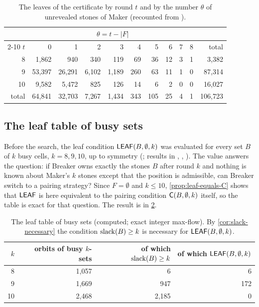 \begin{table}[ht]
\centering\small
\begin{tabular}{@{}rrrrrrrrrrr@{}}
\toprule
 & \multicolumn{9}{c}{$\theta=t-|F|$} & \\
\cmidrule(lr){2-10}
$t$ & 0 & 1 & 2 & 3 & 4 & 5 & 6 & 7 & 8 & total\\
\midrule
 8 & 1{,}862 & 940 & 340 & 119 & 69 & 36 & 12 & 3 & 1 & 3{,}382\\
 9 & 53{,}397 & 26{,}291 & 6{,}102 & 1{,}189 & 260 & 63 & 11 & 1 & 0 & 87{,}314\\
10 & 9{,}582 & 5{,}472 & 825 & 126 & 14 & 6 & 2 & 0 & 0 & 16{,}027\\
\midrule
total & 64{,}841 & 32{,}703 & 7{,}267 & 1{,}434 & 343 & 105 & 25 & 4 & 1 & 106{,}723\\
\bottomrule
\end{tabular}
\caption{The leaves of the certificate by round $t$ and by the number $\theta$ of unrevealed stones of
Maker (recounted from ).}
\label{tab:leaf-theta}
\end{table}

\subsection{The leaf table of busy sets}\label{ssec:leaftable}

Before the search, the leaf condition $\mathsf{LEAF}(B,\emptyset,k)$ was evaluated for every set $B$ of $k$ busy
cells, $k=8,9,10$, up to symmetry (; results in
, , ). The value answers the
question: if Breaker owns exactly the stones $B$ after round $k$ and nothing is known about Maker's $k$
stones except that the position is admissible, can Breaker switch to a pairing strategy? Since $F=\emptyset$
and $k\le 10$, \cref{prop:leaf-equals-C} shows that $\mathsf{LEAF}$ is here equivalent to the pairing condition
$\mathsf{C}(B,\emptyset,k)$ itself, so the table is exact for that question. The result is in \cref{tab:leaftable}.

\begin{table}[ht]
\centering\small
\begin{tabular}{@{}rrrr@{}}
\toprule
$k$ & orbits of busy $k$-sets & of which $\operatorname{slack}(B)\ge k$ & of which $\mathsf{LEAF}(B,\emptyset,k)$\\
\midrule
 8 & 1{,}057 & 6 & 6\\
 9 & 1{,}669 & 947 & 172\\
10 & 2{,}468 & 2{,}185 & 0\\
\bottomrule
\end{tabular}
\caption{The leaf table of busy sets (computed; exact integer max-flow). By \cref{cor:slack-necessary}
the condition $\operatorname{slack}(B)\ge k$ is necessary for $\mathsf{LEAF}(B,\emptyset,k)$.}
\label{tab:leaftable}
\end{table}

